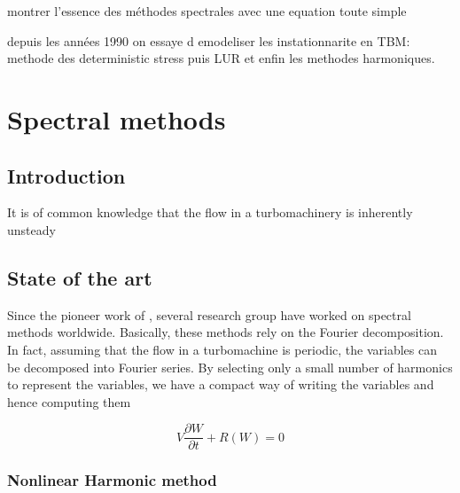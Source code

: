 
montrer l'essence des méthodes spectrales avec une equation toute simple

depuis les années 1990 on essaye d emodeliser les instationnarite en TBM:
methode des deterministic stress puis LUR et enfin les methodes harmoniques.

\chapter{Spectral methods} %
\label{cha:spectral_methods}

\section{Introduction} %
\label{sec:introduction}

It is of common knowledge that the flow in a turbomachinery
is inherently unsteady


\section{State of the art} %
\label{sec:state_of_the_art}

Since the pioneer work of \citet{He1998}, several research group have
worked on spectral methods worldwide.
Basically, these methods rely on the Fourier decomposition.
In fact, assuming that the flow in a turbomachine is periodic,
the variables can be decomposed into Fourier series. By selecting
only a small number of harmonics to represent the variables,
we have a compact way of writing the variables and hence computing them

\begin{equation}
	V \frac{\partial W}{\partial t} + R(W) = 0
	\label{eq:navier_stokes_discrete}
\end{equation}

\subsection{Nonlinear Harmonic method} %
\label{sub:nonlinear_harmonic_method}

